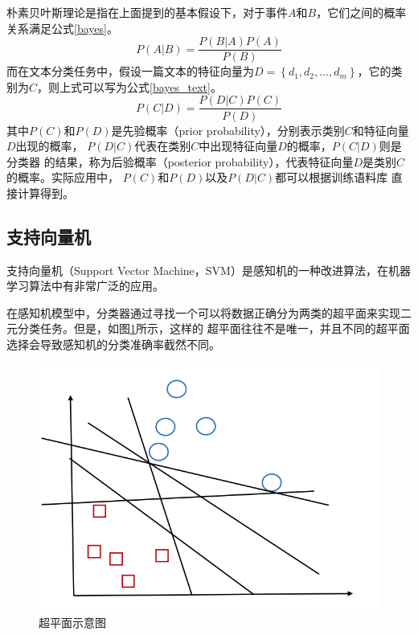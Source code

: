 \documentclass{standalone}
\begin{document}
朴素贝叶斯理论是指在上面提到的基本假设下，对于事件$A$和$B$，它们之间的概率关系满足公式\ref{bayes}。
\begin{equation}
    P\left ( A | B\right )=\frac{P\left ( B | A\right )P\left ( A \right )}{P\left ( B \right )}
    \label{bayes}
\end{equation}
而在文本分类任务中，假设一篇文本的特征向量为$D=\left \{ d_1,d_2,...,d_m \right \}$，它的类别为$C$，则上式可以写为公式\ref{bayes_text}。
\begin{equation}
    P\left ( C | D\right )=\frac{P\left ( D | C\right )P\left ( C \right )}{P\left ( D \right )}
    \label{bayes_text}
\end{equation}
其中$P\left ( C \right )$和$P\left ( D \right )$是先验概率（prior probability），分别表示类别$C$和特征向量$D$出现的概率，
$P\left ( D | C\right )$代表在类别$C$中出现特征向量$D$的概率，$P\left ( C | D\right )$则是分类器
的结果，称为后验概率（posterior probability），代表特征向量$D$是类别$C$的概率。实际应用中，
$P\left ( C \right )$和$P\left ( D \right )$以及$P\left ( D | C\right )$都可以根据训练语料库
直接计算得到。

\subsection{支持向量机}
支持向量机（Support Vector Machine，SVM）是感知机的一种改进算法，在机器学习算法中有非常广泛的应用。

在感知机模型中，分类器通过寻找一个可以将数据正确分为两类的超平面来实现二元分类任务。但是，如图\ref{separating_lines}所示，这样的
超平面往往不是唯一，并且不同的超平面选择会导致感知机的分类准确率截然不同。
\begin{figure}[h]
    \includegraphics[scale=0.4]{picture/separating-lines.png}
    \caption{超平面示意图}
    \label{separating_lines}
\end{figure}
\end{document}
